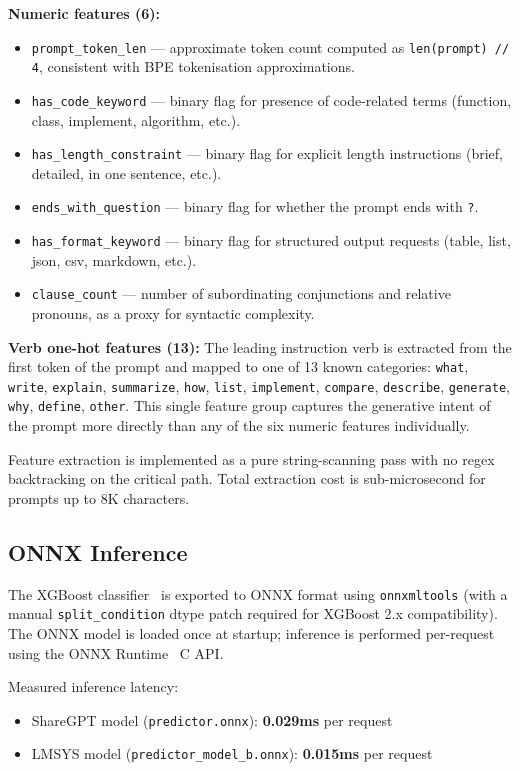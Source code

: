 \documentclass[10pt,letterpaper]{article}
\begin{document}
\textbf{Numeric features (6):}
\begin{itemize}
  \item \texttt{prompt\_token\_len} --- approximate token count computed as \texttt{len(prompt) // 4}, consistent with BPE tokenisation approximations.
  \item \texttt{has\_code\_keyword} --- binary flag for presence of code-related terms (function, class, implement, algorithm, etc.).
  \item \texttt{has\_length\_constraint} --- binary flag for explicit length instructions (brief, detailed, in one sentence, etc.).
  \item \texttt{ends\_with\_question} --- binary flag for whether the prompt ends with \texttt{?}.
  \item \texttt{has\_format\_keyword} --- binary flag for structured output requests (table, list, json, csv, markdown, etc.).
  \item \texttt{clause\_count} --- number of subordinating conjunctions and relative pronouns, as a proxy for syntactic complexity.
\end{itemize}

\textbf{Verb one-hot features (13):} The leading instruction verb is extracted from the first token of the prompt and mapped to one of 13 known categories: \texttt{what}, \texttt{write}, \texttt{explain}, \texttt{summarize}, \texttt{how}, \texttt{list}, \texttt{implement}, \texttt{compare}, \texttt{describe}, \texttt{generate}, \texttt{why}, \texttt{define}, \texttt{other}. This single feature group captures the generative intent of the prompt more directly than any of the six numeric features individually.

Feature extraction is implemented as a pure string-scanning pass with no regex backtracking on the critical path. Total extraction cost is sub-microsecond for prompts up to 8K characters.

\subsection{ONNX Inference}

The XGBoost classifier~\cite{chen2016xgboost} is exported to ONNX format using \texttt{onnxmltools} (with a manual \texttt{split\_condition} dtype patch required for XGBoost 2.x compatibility). The ONNX model is loaded once at startup; inference is performed per-request using the ONNX Runtime~\cite{onnxruntime2018} C API.

Measured inference latency:
\begin{itemize}
  \item ShareGPT model (\texttt{predictor.onnx}): \textbf{0.029ms} per request
  \item LMSYS model (\texttt{predictor\_model\_b.onnx}): \textbf{0.015ms} per request
\end{itemize}
\end{document}
